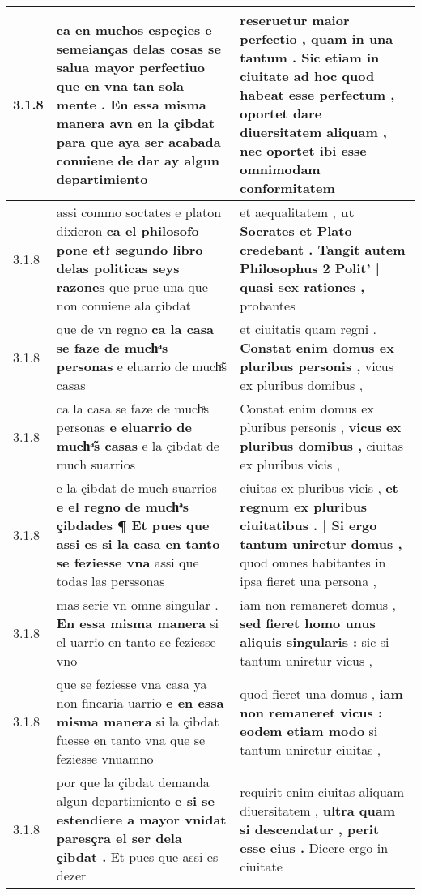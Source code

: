 \begin{tabular}{|p{1cm}|p{6.5cm}|p{6.5cm}|}
3.1.8 & ca en muchos espeçies e semeianças delas cosas se salua mayor perfectiuo que en vna tan sola mente . \textbf{ En essa misma manera avn en la çibdat } para que aya ser acabada conuiene de dar ay algun departimiento & reseruetur maior perfectio , \textbf{ quam in una tantum . Sic etiam in ciuitate } ad hoc quod habeat esse perfectum , oportet dare diuersitatem aliquam , nec oportet ibi esse omnimodam conformitatem \\\hline
3.1.8 & assi commo soctates e platon dixieron \textbf{ ca el philosofo pone etł segundo libro delas politicas seys razones } que prue una que non conuiene ala çibdat & et aequalitatem , \textbf{ ut Socrates et Plato credebant . Tangit autem Philosophus 2 Polit’ | quasi sex rationes , } probantes \\\hline
3.1.8 & que de vn regno \textbf{ ca la casa se faze de muchͣs personas } e eluarrio de muchͣ̃s casas & et ciuitatis quam regni . \textbf{ Constat enim domus ex pluribus personis , } vicus ex pluribus domibus , \\\hline
3.1.8 & ca la casa se faze de muchͣs personas \textbf{ e eluarrio de muchͣ̃s casas } e la çibdat de much suarrios & Constat enim domus ex pluribus personis , \textbf{ vicus ex pluribus domibus , } ciuitas ex pluribus vicis , \\\hline
3.1.8 & e la çibdat de much suarrios \textbf{ e el regno de muchͣs çibdades ¶ Et pues que assi es si la casa en tanto se feziesse vna } assi que todas las perssonas & ciuitas ex pluribus vicis , \textbf{ et regnum ex pluribus ciuitatibus . | Si ergo tantum uniretur domus , } quod omnes habitantes in ipsa fieret una persona , \\\hline
3.1.8 & mas serie vn omne singular . \textbf{ En essa misma manera } si el uarrio en tanto se feziesse vno & iam non remaneret domus , \textbf{ sed fieret homo unus aliquis singularis : } sic si tantum uniretur vicus , \\\hline
3.1.8 & que se feziesse vna casa ya non fincaria uarrio \textbf{ e en essa misma manera } si la çibdat fuesse en tanto vna que se feziesse vnuamno & quod fieret una domus , \textbf{ iam non remaneret vicus : eodem etiam modo } si tantum uniretur ciuitas , \\\hline
3.1.8 & por que la çibdat demanda algun departimiento \textbf{ e si se estendiere a mayor vnidat paresçra el ser dela çibdat . } Et pues que assi es dezer & requirit enim ciuitas aliquam diuersitatem , \textbf{ ultra quam si descendatur , perit esse eius . } Dicere ergo in ciuitate \\\hline

\end{tabular}
